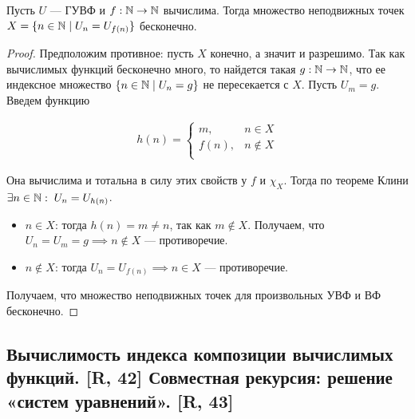 \documentclass[a4paper, fleqn]{article}
\begin{document}
        \begin{proposition}
            Пусть $U$ --- ГУВФ и $f : \mathbb{N} \to \mathbb{N}$ вычислима. Тогда множество неподвижных точек $X = \{n \in \mathbb{N} \mid U_n = U_{f(n)}\}$ бесконечно.
        \end{proposition}

        \begin{proof}
            Предположим противное: пусть $X$ конечно, а значит и разрешимо. Так как вычислимых функций бесконечно много, то найдется такая $g : \mathbb{N} \to \mathbb{N}$, что ее индексное множество $\{n \in \mathbb{N} \mid U_n = g\}$ не пересекается с $X$. Пусть $U_m = g$. Введем функцию

            \begin{equation*}
            \begin{gathered}
            h(n) =
            \begin{cases}
            m, & n \in X \\
            f(n), & n \notin X \\
            \end{cases}
            \end{gathered}
            \end{equation*}

            Она вычислима и тотальна в силу этих свойств у $f$ и $\chi_X$. Тогда по теореме Клини $\exists n \in \mathbb{N} : \; U_n = U_{h(n)}$.

            \begin{itemize}
                \item $n \in X$: \; тогда $h(n) = m \ne n$, так как $m \notin X$. Получаем, что $U_n = U_m = g \implies n \notin X$ --- противоречие.

                \item $n \notin X$: \; тогда $U_n = U_{f(n)} \implies n \in X$ --- противоречие.
            \end{itemize}

            Получаем, что множество неподвижных точек для произвольных УВФ и ВФ бесконечно.
        \end{proof}

    \subsection{Вычислимость индекса композиции вычислимых функций. [R, 42] Совместная рекурсия: решение «систем уравнений». [R, 43]}
\end{document}
